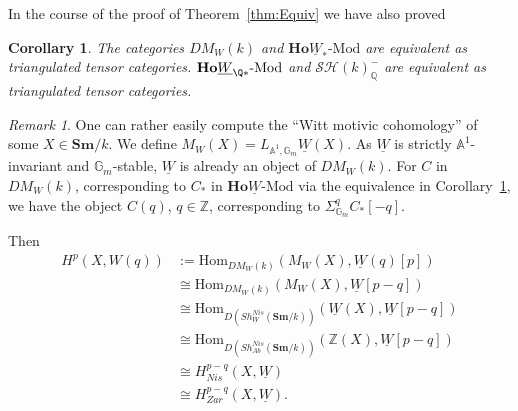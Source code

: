 \documentclass[a4paper,12pt,draft]{amsart}
\newtheorem{corollary}{Corollary}
\theoremstyle{definition}
\theoremstyle{remark}
\newtheorem{remark}{Remark}
\begin{document}
In the course of the proof of Theorem~\ref{thm:Equiv} we have also proved
\begin{corollary}\label{cor:Equiv}  The categories $DM_W(k)$ and  ${{\mathbf{Ho}}}  \underline{W}_{*}\text{-Mod}$ are equivalent as triangulated tensor categories. ${{\mathbf{Ho}}}  \underline{W}_{\Q*}\text{-Mod}$ and ${\mathcal{SH}}(k)^-_{{\mathbb Q}}$ are  equivalent as triangulated tensor categories. 
\end{corollary}

\begin{remark} One can rather easily compute the ``Witt motivic cohomology'' of some $X\in{{\mathbf{Sm}}}/k$. We define $M_W(X)=L_{{{\mathbb A}}^1,{{\mathbb G}}_m}\underline{W}(X)$. As  $\underline{W}$ is strictly ${{\mathbb A}}^1$-invariant and ${{\mathbb G}}_m$-stable, $\underline{W}$ is already an object of $DM_W(k)$. For $C$ in $DM_W(k)$, corresponding to $C_*$ in ${{\mathbf{Ho}}} \underline{W}\text{-Mod}$ via the equivalence in Corollary~\ref{cor:Equiv}, we have the object $C(q)$, $q\in{{\mathbb Z}}$,  corresponding to $\Sigma^q_{{{\mathbb G}}_m}C_*[-q]$.
 

Then
\begin{align*}
H^p(X,W(q))&:={\text{Hom}}_{DM_W(k)}(M_W(X), \underline{W}(q)[p])\\&\cong  {\text{Hom}}_{DM_W(k)}(M_W(X), \underline{W}[p-q])\\
&\cong {\text{Hom}}_{D(Sh^{Nis}_{\underline{W}}({{\mathbf{Sm}}}/k))}(\underline{W}(X), \underline{W}[p-q])\\
&\cong {\text{Hom}}_{D(Sh^{Nis}_{Ab}({{\mathbf{Sm}}}/k))}({{\mathbb Z}}(X), \underline{W}[p-q])\\
&\cong H^{p-q}_{Nis}(X, \underline{W})\\
&\cong H^{p-q}_{Zar}(X, \underline{W}).
\end{align*}
\end{remark}
\end{document}
